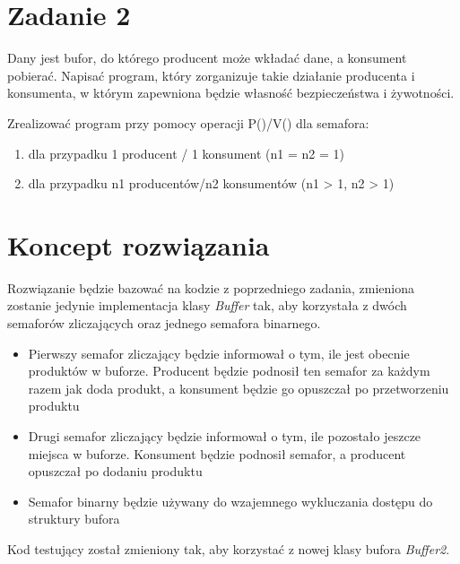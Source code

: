 \documentclass[12pt]{article}
\begin{document}
\newpage
\section{Zadanie 2}
Dany jest bufor, do którego producent może wkładać dane, a konsument pobierać. Napisać program, który zorganizuje takie działanie producenta i konsumenta, w którym zapewniona będzie własność bezpieczeństwa i żywotności.

Zrealizować program przy pomocy operacji P()/V() dla semafora:
\begin{enumerate}[label=\alph*.]
    \item dla przypadku 1 producent / 1 konsument (n1 = n2 = 1)
    \item dla przypadku n1 producentów/n2 konsumentów (n1 > 1, n2 > 1)
\end{enumerate}


\section{Koncept rozwiązania}
Rozwiązanie będzie bazować na kodzie z poprzedniego zadania, zmieniona zostanie jedynie implementacja klasy \emph{Buffer} tak, aby korzystała z dwóch semaforów zliczających oraz jednego semafora binarnego.
\begin{itemize}
    \item Pierwszy semafor zliczający będzie informował o tym, ile jest obecnie produktów w buforze. Producent będzie podnosił ten semafor za każdym razem jak doda produkt, a konsument będzie go opuszczał po przetworzeniu produktu
    \item Drugi semafor zliczający będzie informował o tym, ile pozostało jeszcze miejsca w buforze. Konsument będzie podnosił semafor, a producent opuszczał po dodaniu produktu
    \item Semafor binarny będzie używany do wzajemnego wykluczania dostępu do struktury bufora
\end{itemize}


Kod testujący został zmieniony tak, aby korzystać z nowej klasy bufora \emph{Buffer2}.
\end{document}
